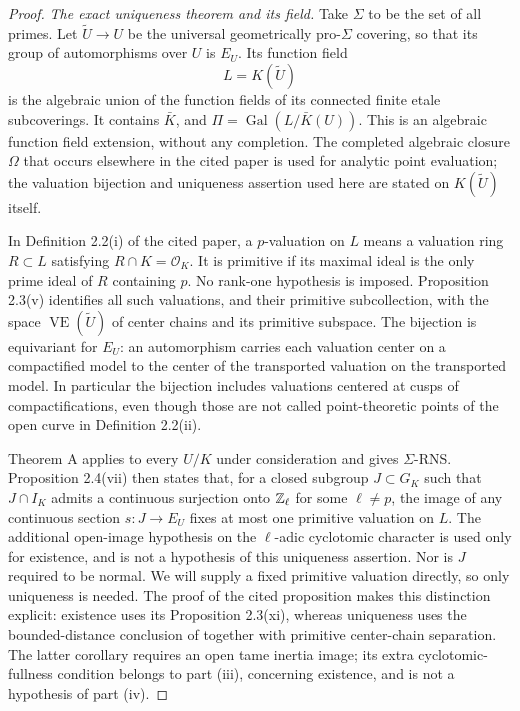 \begin{proof}
\emph{The exact uniqueness theorem and its field.}
Take $\Sigma$ to be the set of all primes. Let
$\widetilde U\to U$ be the universal geometrically pro-$\Sigma$
covering, so that its group of automorphisms over $U$ is $E_U$.
Its function field
\[
 L=K(\widetilde U)
\]
is the algebraic union of the function fields of its connected finite
etale subcoverings. It contains $\bar K$, and
$\Pi=\operatorname{Gal}(L/\bar K(U))$. This is an algebraic function
field extension, without any completion. The completed algebraic closure
$\Omega$ that occurs elsewhere in the cited paper is used for analytic
point evaluation; the valuation bijection and uniqueness assertion used
here are stated on $K(\widetilde U)$ itself.

In Definition 2.2(i) of the cited paper, a $p$-valuation on $L$ means a
valuation ring $R\subset L$ satisfying $R\cap K=\mathcal O_K$.
It is primitive if its maximal ideal is the only prime ideal of $R$
containing $p$. No rank-one hypothesis is imposed. Proposition 2.3(v)
identifies all such valuations, and their primitive subcollection, with
the space $\operatorname{VE}(\widetilde U)$ of center chains and its
primitive subspace. The bijection is equivariant for $E_U$: an
automorphism carries each valuation center on a compactified model to
the center of the transported valuation on the transported model.
In particular the bijection includes valuations centered at cusps of
compactifications, even though those are not called point-theoretic
points of the open curve in Definition 2.2(ii).

Theorem A applies to every $U/K$ under consideration and gives
$\Sigma$-RNS. Proposition 2.4(vii) then states that, for a closed subgroup
$J\subset G_K$ such that $J\cap I_K$ admits a continuous surjection
onto $\mathbb Z_\ell$ for some $\ell\ne p$, the image of any continuous
section $s:J\to E_U$ fixes at most one primitive valuation on $L$.
The additional open-image hypothesis on the $\ell$-adic cyclotomic
character is used only for existence, and is not a hypothesis of this
uniqueness assertion. Nor is $J$ required to be normal. We will supply a
fixed primitive valuation directly, so only uniqueness is needed.
The proof of the cited proposition makes this distinction explicit:
existence uses its Proposition 2.3(xi), whereas uniqueness uses the
bounded-distance conclusion of
\citet[Corollary 1.15(iv)]{BC_HMTopicsIV} together with primitive
center-chain separation. The latter corollary requires an open tame
inertia image; its extra cyclotomic-fullness condition belongs to
part (iii), concerning existence, and is not a hypothesis of part (iv).


\end{proof}
